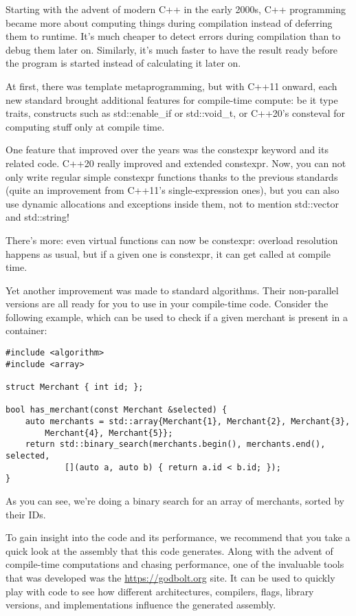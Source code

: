 
Starting with the advent of modern C++ in the early 2000s, C++ programming became more about computing things during compilation instead of deferring them to runtime. It's much cheaper to detect errors during compilation than to debug them later on. Similarly, it's much faster to have the result ready before the program is started instead of calculating it later on.

At first, there was template metaprogramming, but with C++11 onward, each new standard brought additional features for compile-time compute: be it type traits, constructs such as std::enable\_if or std::void\_t, or C++20's consteval for computing stuff only at compile time.

One feature that improved over the years was the constexpr keyword and its related code. C++20 really improved and extended constexpr. Now, you can not only write regular simple constexpr functions thanks to the previous standards (quite an improvement from C++11's single-expression ones), but you can also use dynamic allocations and exceptions inside them, not to mention std::vector and std::string!

There's more: even virtual functions can now be constexpr: overload resolution happens as usual, but if a given one is constexpr, it can get called at compile time.

Yet another improvement was made to standard algorithms. Their non-parallel versions are all ready for you to use in your compile-time code. Consider the following example, which can be used to check if a given merchant is present in a container:

\begin{lstlisting}[style=styleCXX]
#include <algorithm>
#include <array>

struct Merchant { int id; };

bool has_merchant(const Merchant &selected) {
	auto merchants = std::array{Merchant{1}, Merchant{2}, Merchant{3},
		Merchant{4}, Merchant{5}};
	return std::binary_search(merchants.begin(), merchants.end(), selected,
			[](auto a, auto b) { return a.id < b.id; });
}
\end{lstlisting}

As you can see, we're doing a binary search for an array of merchants, sorted by their IDs.

To gain insight into the code and its performance, we recommend that you take a quick look at the assembly that this code generates. Along with the advent of compile-time computations and chasing performance, one of the invaluable tools that was developed was the \url{https://godbolt.org} site. It can be used to quickly play with code to see how different architectures, compilers, flags, library versions, and implementations influence the generated assembly.

